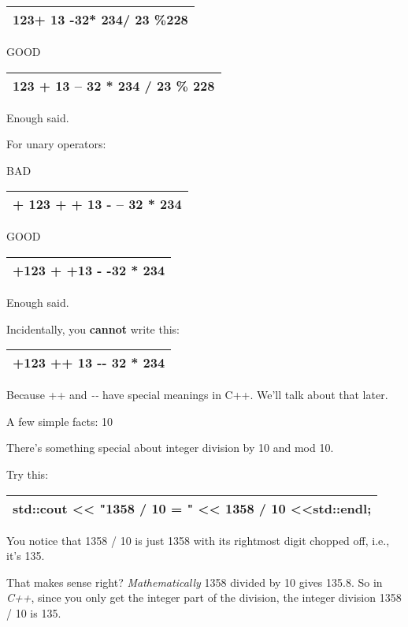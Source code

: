 \documentclass[
]{article}
\begin{document}
\begin{longtable}[]{@{}l@{}}
\toprule
\endhead
123+ 13 -32* 234/ 23 \%228\tabularnewline
\bottomrule
\end{longtable}

GOOD

\begin{longtable}[]{@{}l@{}}
\toprule
\endhead
123 + 13 -- 32 * 234 / 23 \% 228\tabularnewline
\bottomrule
\end{longtable}

Enough said.

For unary operators:

BAD

\begin{longtable}[]{@{}l@{}}
\toprule
\endhead
+ 123 + + 13 - -- 32 * 234\tabularnewline
\bottomrule
\end{longtable}

GOOD

\begin{longtable}[]{@{}l@{}}
\toprule
\endhead
+123 + +13 - -32 * 234\tabularnewline
\bottomrule
\end{longtable}

Enough said.

Incidentally, you \textbf{cannot} write this:

\begin{longtable}[]{@{}l@{}}
\toprule
\endhead
+123 ++ 13 -\/- 32 * 234\tabularnewline
\bottomrule
\end{longtable}

Because ++ and \emph{-\/- }have special meanings in C++. We'll talk
about that later.

A few simple facts: 10

There's something special about integer division by 10 and mod 10.

Try this:

\begin{longtable}[]{@{}l@{}}
\toprule
\endhead
std::cout \textless\textless{} "1358 / 10 = " \textless\textless{} 1358
/ 10 \textless\textless std::endl;\tabularnewline
\bottomrule
\end{longtable}

You notice that 1358 / 10 is just 1358 with its rightmost digit chopped
off, i.e., it's 135.

That makes sense right? \emph{Mathematically} 1358 divided by 10 gives
135.8. So in \emph{C++}, since you only get the integer part of the
division, the integer division 1358 / 10 is 135.
\end{document}
